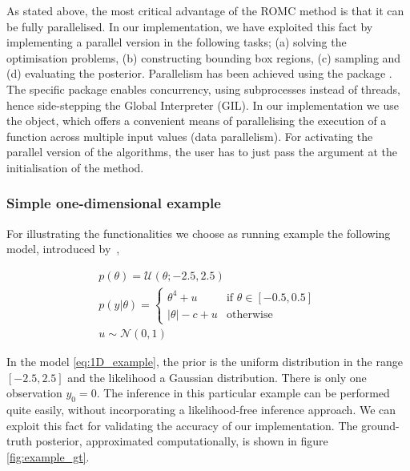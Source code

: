 As stated above, the most critical advantage of the ROMC method is that it can be fully parallelised. In our implementation, we have exploited this fact by implementing a parallel version in the following tasks; (a) solving the optimisation problems, (b) constructing bounding box regions, (c) sampling and (d) evaluating the posterior. Parallelism has been achieved using the package . The specific package enables concurrency, using subprocesses instead of threads, hence side-stepping the Global Interpreter (GIL). In our implementation we use the  object, which offers a convenient means of parallelising the execution of a function across multiple input values (data parallelism). For activating the parallel version of the algorithms, the user has to just pass the argument  at the initialisation of the  method.


\subsubsection*{Simple one-dimensional example}

For illustrating the functionalities we choose as running example the
following model, introduced by~\autocite{Ikonomov2019},

\begin{gather} \label{eq:1D_example} p(\theta) =
\mathcal{U}(\theta;-2.5,2.5)\\ p(y|\theta) = \left\{
    \begin{array}{ll} \theta^4 + u & \mbox{if } \theta \in [-0.5, 0.5]
\\ |\theta| - c + u & \mbox{otherwise}
    \end{array} \right.\\ u \sim \mathcal{N}(0,1)
\end{gather}

\noindent

In the model \eqref{eq:1D_example}, the prior is the uniform
distribution in the range $[-2.5, 2.5]$ and the likelihood a Gaussian
distribution. There is only one observation $y_0 = 0$. The inference
in this particular example can be performed quite easily, without
incorporating a likelihood-free inference approach. We can exploit this
fact for validating the accuracy of our implementation. The
ground-truth posterior, approximated computationally, is shown in
figure \ref{fig:example_gt}.

